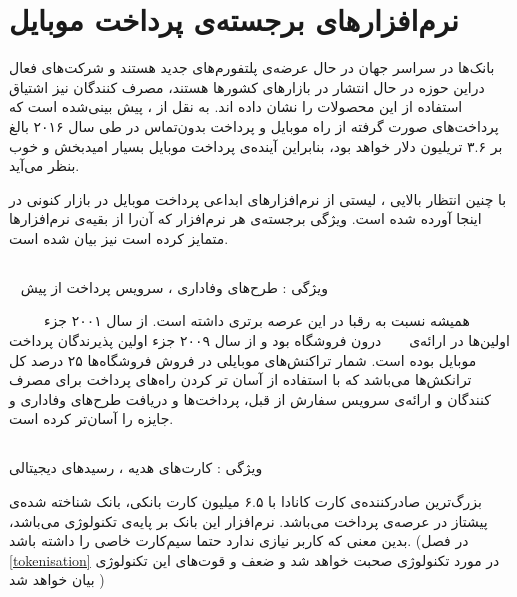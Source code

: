 \documentclass[oneside]{report}
\begin{document}
	\section{‌‌نرم‌افزار‌های برجسته‌ی پرداخت موبایل }		
		بانک‌ها در سراسر جهان در حال عرضه‌ی پلتفورم‌های جدید هستند و شرکت‌های فعال دراین حوزه در حال انتشار در بازار‌های کشورها هستند، مصرف کنندگان نیز اشتیاق استفاده از این محصولات را نشان داده اند. 
	به نقل از 
			 									 {\normalsize {}}
			 									 ، پیش بینی‌شده است که پرداخت‌های صورت گرفته از راه موبایل و پرداخت بدون‌تماس در طی سال ۲۰۱۶  بالغ بر ۳.۶ تریلیون دلار خواهد بود، بنابراین آینده‌ی پرداخت موبایل بسیار امید‌بخش و خوب بنظر می‌آید. 
	\cite{juniperresearch}
			 									 
			 									 با چنین انتظار بالایی ، لیستی از نرم‌افزار‌های ابداعی پرداخت موبایل در بازار کنونی در اینجا آورده شده است. ویژگی برجسته‌ی هر نرم‌افزار که آن‌را از بقیه‌ی نرم‌افزار‌ها متمایز کرده است نیز بیان شده است.
	\subsection{ {\small {}}}
		 			 									 ویژگی : طرح‌های وفاداری ، سرویس پرداخت از پیش
	
	 			 				 {\normalsize {}}	 			 									 
	 	 همیشه نسبت به رقبا در این عرصه برتری داشته است. از سال ۲۰۰۱ جزء اولین‌ها در ارائه‌ی 
	 	 			 									 {\normalsize {}} 
	 	 			 									 درون فروشگاه بود و از سال ۲۰۰۹ جزء اولین پذیرندگان پرداخت موبایل بوده است. شمار تراکنش‌های موبایلی در فروش فروشگاه‌ها ۲۵ درصد کل ترانکش‌ها می‌باشد که با استفاده از آسان تر کردن راه‌های پرداخت برای مصرف کنندگان و ارائه‌ی سرویس سفارش از قبل، پرداخت‌ها و دریافت طرح‌های وفاداری و جایزه را آسان‌تر کرده است. 
	 	 			 									 
		\subsection{ {\small {}}}
		ویژگی : کارت‌های هدیه ، رسید‌های دیجیتالی
		
		بزرگ‌ترین  صادرکننده‌ی کارت
		 کانادا با ۶.۵ میلیون کارت بانکی، بانک شناخته شده‌ی پیشتاز در عرصه‌ی پرداخت می‌باشد. نرم‌افزار این بانک بر پایه‌ی تکنولوژی 			
	 {\normalsize {}} 	 
	 می‌باشد، بدین معنی که کاربر نیازی ندارد حتما سیم‌کارت خاصی را داشته باشد. (در فصل 
	 \ref{tokenisation}
	 در مورد تکنولوژی 
	 {\normalsize {}} 
	 صحبت خواهد شد و ضعف و قوت‌های این تکنولوژی بیان خواهد شد
	 )
	
\end{document}
